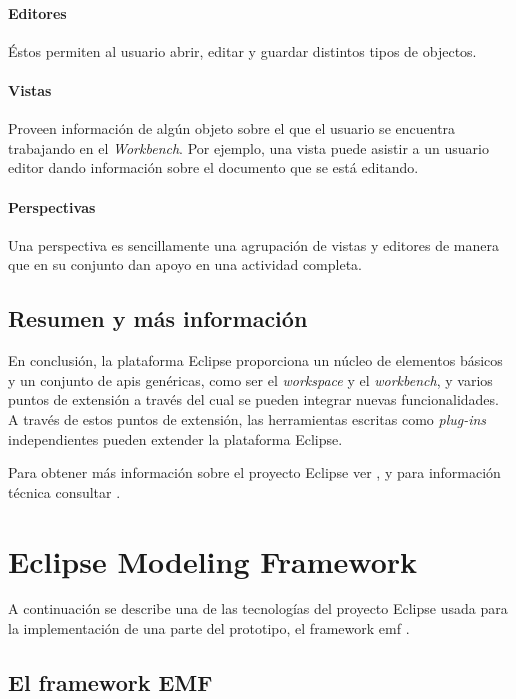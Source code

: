 \documentclass[a4paper,12pt,oneside,spanish]{book}
\begin{document}
\paragraph{Editores} Éstos permiten al usuario abrir, editar y guardar distintos tipos de objectos.

\paragraph{Vistas} Proveen información de algún objeto sobre el que el usuario se encuentra trabajando en el \textit{Workbench}. Por ejemplo, una vista puede asistir a un usuario editor dando información sobre el documento que se está editando.

\paragraph{Perspectivas} Una perspectiva es sencillamente una agrupación de vistas y editores de manera que en su conjunto dan apoyo en una actividad completa.


\subsection{Resumen y más información}

En conclusión, la plataforma \textsf{Eclipse} proporciona un núcleo de elementos básicos y un conjunto de \glspl{api} genéricas, como ser el \textit{workspace} y el \textit{workbench}, y varios puntos de extensión a través del cual se pueden integrar nuevas funcionalidades. A través de estos puntos de extensión, las herramientas escritas como \textit{plug-ins} independientes pueden extender la plataforma \textsf{Eclipse}.

Para obtener más información sobre el proyecto \textsf{Eclipse} ver \cite[\url{www.eclipse.org}]{Eclipse}, y para información técnica consultar \cite[Eclipse Platform Technical Overview]{EclipseTech}.


\section{Eclipse Modeling Framework}

A continuación se describe una de las tecnologías del proyecto \textsf{Eclipse} usada para la implementación de una parte del prototipo, el framework \gls{emf} \cite{EMF}.

\subsection{El framework EMF}
\end{document}
